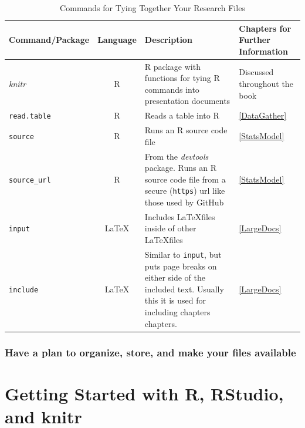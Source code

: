 \documentclass[ChapterTOCs,krantz1]{krantz}\usepackage{graphicx, color}
\begin{document}
\begin{landscape}
\begin{table}
    \caption{Commands for Tying Together Your Research Files}
    \label{TableTieCommands}
    \vspace{0.3cm}
    \begin{tabular}{l c  p{6.5cm}  p{4cm}}
        \hline
        Command/Package & Language & Description & Chapters for Further Information \\  
        \hline \hline
        {\emph{knitr}} & R & R package with functions for tying R commands into presentation documents & Discussed throughout the book \\
        {\tt{read.table}} & R & Reads a table into R & \ref{DataGather} \\
        {\tt{source}} & R & Runs an R source code file & \ref{StatsModel} \\
        {\tt{source\_url}} & R & From the {\emph{devtools}} package. Runs an R source code file from a secure ({\tt{https}}) url like those used by GitHub & \ref{StatsModel} \\
        {\tt{input}} & \LaTeX & Includes \LaTeX files inside of other \LaTeX files & \ref{LargeDocs} \\
        {\tt{include}} & \LaTeX & Similar to {\tt{input}}, but puts page breaks on either side of the included text. Usually this it is used for including chapters chapters. & \ref{LargeDocs} \\
        
        \hline 
        
    \end{tabular}
\end{table}
\end{landscape}


\subsection{Have a plan to organize, store, and make your files available}





\chapter{Getting Started with R, RStudio, and knitr}\label{GettingStarted}
\end{document}

